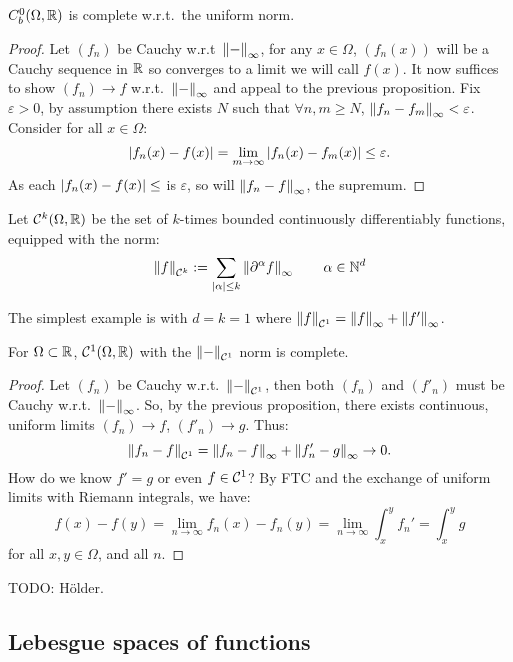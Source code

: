 \documentclass{article}
\begin{document}
\begin{proposition}
    $C_b^0(\Omega,\mathbb{R})$ is complete w.r.t.~the uniform norm.
    \begin{proof}
        Let $(f_n)$ be Cauchy w.r.t~$\left\lVert - \right\rVert_\infty$, for any $x\in \Omega$, $(f_n(x))$ will be a Cauchy sequence in $\mathbb{R}$ so converges to a limit we will call $f(x)$. It now suffices to show $(f_n)\rightarrow f$ w.r.t.~$\left\lVert - \right\rVert_\infty$ and appeal to the previous proposition. Fix $\varepsilon > 0$, by assumption there exists $N$ such that $\forall n,m\geq N$, $\left\lVert f_n-f_m \right\rVert_\infty < \varepsilon$. Consider for all $x\in \Omega$: \[
        \left| f_n(x)-f(x) \right| = \lim_{m\rightarrow\infty}\left| f_n(x)-f_m(x) \right| \leq \varepsilon.
        \] As each $\left| f_n(x)-f(x) \right|\leq$ is  $\varepsilon$, so will $\left\lVert f_n-f \right\rVert_\infty$, the supremum.
    \end{proof}
\end{proposition}

\begin{definition}
    Let $\mathcal{C}^k(\Omega,\mathbb{R})$ be the set of $k$-times bounded continuously differentiably functions, equipped with the norm: \[
    \left\lVert f \right\rVert_{\mathcal{C}^k} := \sum_{\left| \alpha \right|\leq k} \left\lVert \partial^\alpha f \right\rVert_\infty \qquad \alpha \in \mathbb{N}^d
    \]
\end{definition}

The simplest example is with $d=k=1$ where $\left\lVert f \right\rVert_{\mathcal{C}^1} = \left\lVert f \right\rVert_\infty + \left\lVert f' \right\rVert_\infty$.

\begin{proposition}
    For $\Omega\subset \mathbb{R}$, $\mathcal{C}^1(\Omega,\mathbb{R})$ with the $\left\lVert - \right\rVert_{\mathcal{C}^1}$ norm is complete.
    \begin{proof}
        Let $(f_n)$ be Cauchy w.r.t.~$\left\lVert - \right\rVert_{\mathcal{C}^1}$, then both $(f_n)$ and $(f'_n)$ must be Cauchy w.r.t.~$\left\lVert - \right\rVert_\infty$. So, by the previous proposition, there exists continuous, uniform limits $(f_n)\rightarrow f$, $(f'_n)\rightarrow g$. Thus: \[
        \left\lVert f_n-f \right\rVert_{\mathcal{C}^1} = \left\lVert f_n-f \right\rVert_\infty + \left\lVert f'_n-g \right\rVert_\infty \rightarrow 0.\]
        How do we know $f'=g$ or even $f\in\mathcal{C}^1$? By FTC and the exchange of uniform limits with Riemann integrals, we have: \[
        f(x)-f(y) = \lim_{n\rightarrow\infty}f_n(x)-f_n(y) = \lim_{n\rightarrow\infty}\int_x^yf_n' = \int_x^yg
        \] for all $x,y\in\Omega$, and all $n$.
    \end{proof}
\end{proposition}

TODO: H\"older.

\subsection{Lebesgue spaces of functions}
\end{document}
